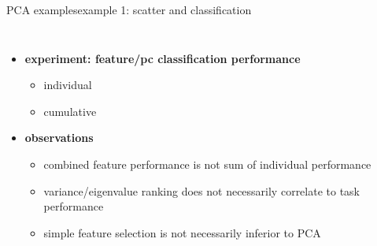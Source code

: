 \begin{frame}{PCA examples}{example 1: scatter and classification}
		\vspace{-5mm}
    \begin{columns}
        
        \begin{itemize}
            \item \textbf{experiment: feature/pc classification performance}
							\begin{itemize}
								\item individual 
								\item cumulative 
							\end{itemize}
            \bigskip
						\item<2-> \textbf{observations}
            \begin{itemize}
                \item   combined feature performance is not sum of individual performance
                \item   variance/eigenvalue ranking does not necessarily correlate to task performance
                \item   simple feature selection is not necessarily inferior to PCA
            \end{itemize}
        \end{itemize}
        \vspace{-5mm}
    \end{columns}
\end{frame}

